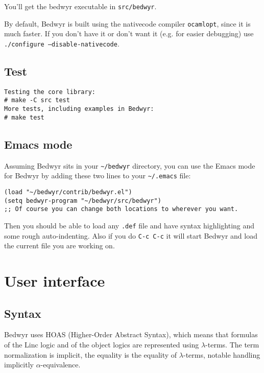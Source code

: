 \documentclass{article}
\begin{document}
You'll get the bedwyr executable in \texttt{src/bedwyr}.

By default, Bedwyr is built using the nativecode compiler \texttt{ocamlopt},
since it is much faster. If you don't have it or don't want it (e.g.
for easier debugging) use \texttt{./configure --disable-nativecode}.

\subsection{Test}

\begin{verbatim}
Testing the core library:
# make -C src test
More tests, including examples in Bedwyr:
# make test
\end{verbatim}

\subsection{Emacs mode}

Assuming Bedwyr sits in your \verb.~/bedwyr. directory,
you can use the Emacs mode for Bedwyr by adding these two lines to your
\verb,~/.emacs, file:
\begin{verbatim}
(load "~/bedwyr/contrib/bedwyr.el")
(setq bedwyr-program "~/bedwyr/src/bedwyr")
;; Of course you can change both locations to wherever you want.
\end{verbatim}

Then you should be able to load any \verb:.def: file
and have syntax highlighting and some rough auto-indenting.
Also if you do \verb.C-c C-c. it will start Bedwyr
and load the current file you are working on.

\newpage
\section{User interface}
\label{sec:interface}

\subsection{Syntax}

Bedwyr uses HOAS (Higher-Order Abstract Syntax), which means that formulas
of the Linc logic and of the object logics are represented using 
$\lambda$-terms. The term normalization is implicit, the equality is the 
equality of $\lambda$-terms, notable handling implicitly $\alpha$-equivalence.
\end{document}
